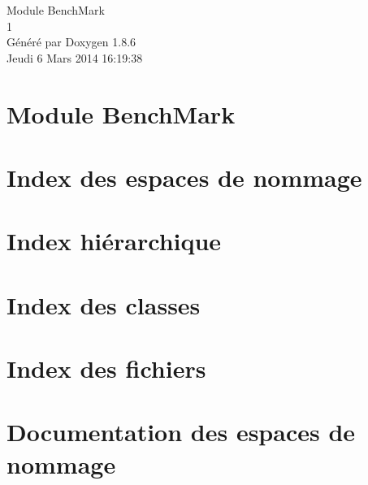 \documentclass[twoside]{book}
\newcommand{\clearemptydoublepage}{%
  \newpage{\pagestyle{empty}\cleardoublepage}%
}
\begin{document}
\hypersetup{pageanchor=false}
\begin{titlepage}
\vspace*{7cm}
\begin{center}%
{\Large Module Bench\-Mark \\[1ex]\large 1 }\\
\vspace*{1cm}
{\large Généré par Doxygen 1.8.6}\\
\vspace*{0.5cm}
{\small Jeudi 6 Mars 2014 16:19:38}\\
\end{center}
\end{titlepage}
\clearemptydoublepage
\tableofcontents
\clearemptydoublepage
{}
\hypersetup{pageanchor=true}

\chapter{Module Bench\-Mark}
\label{index}\hypertarget{index}{}
\chapter{Index des espaces de nommage}

\chapter{Index hiérarchique}

\chapter{Index des classes}

\chapter{Index des fichiers}

\chapter{Documentation des espaces de nommage}



\end{document}
